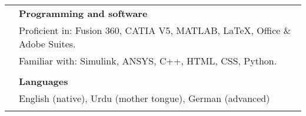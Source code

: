 \documentclass[letterpaper, 11pt]{article}
\begin{document}
\begin{longtable}{p{1.3in}p{4.8in}}



    {\color{OliveGreen}{Skills}}
     & \textbf{Programming and software}                                                                                                                                                                                  \\
     & Proficient in: Fusion 360, CATIA V5, MATLAB, \LaTeX, Office \& Adobe Suites.                                                                                                                                       \\
     & Familiar with: Simulink, ANSYS, C++, HTML, CSS, Python.                                                                                                                                                            \\
     &                                                                                                                                                                                                                    \\

     & \textbf{Languages}                                                                                                                                                                                                 \\
     & English (native), Urdu (mother tongue), German (advanced)                                                                                                                                                          \\
     &                                                                                                                                                                                                                    \\


\end{longtable}
\end{document}
